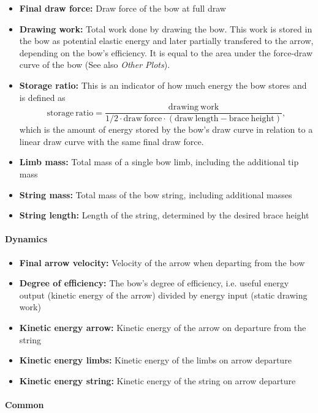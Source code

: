 \documentclass[12pt]{article}
\begin{document}
\begin{itemize}
\item \textbf{Final draw force:} Draw force of the bow at full draw
\item \textbf{Drawing work:} Total work done by drawing the bow. This work is stored in the bow as potential elastic energy and later partially transfered to the arrow, depending on the bow's efficiency. It is equal to the area under the force-draw curve of the bow (See also \textit{Other Plots}).
    \item \textbf{Storage ratio:} This is an indicator of how much energy the bow stores and is defined as
$$\mathrm{storage\ ratio} = \frac{\mathrm{drawing\ work}}{1/2\cdot \mathrm{draw\ force}\cdot (\mathrm{draw\ length} - \mathrm{brace\ height})},$$
which is the amount of energy stored by the bow's draw curve in relation to a linear draw curve with the same final draw force.
\item \textbf{Limb mass:} Total mass of a single bow limb, including the additional tip mass
\item \textbf{String mass:}  Total mass of the bow string, including additional masses
\item \textbf{String length:} Length of the string, determined by the desired brace height
\end{itemize}

\paragraph*{Dynamics}

\begin{itemize}
\item \textbf{Final arrow velocity:} Velocity of the arrow when departing from the bow
\item \textbf{Degree of efficiency:} The bow's degree of efficiency, i.e. useful energy output (kinetic energy of the arrow) divided by energy input (static drawing work)
\item \textbf{Kinetic energy arrow:} Kinetic energy of the arrow on departure from the string
\item \textbf{Kinetic energy limbs:} Kinetic energy of the limbs on arrow departure
\item \textbf{Kinetic energy string:} Kinetic energy of the string on arrow departure
\end{itemize}

\paragraph*{Common}
\end{document}
